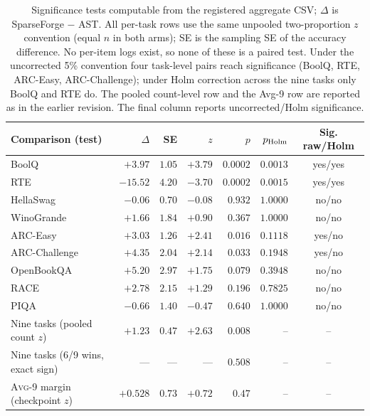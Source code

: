 \documentclass{article}
\newcommand{\taskavg}{\textsc{Avg}-9}
\begin{document}
\begin{table}[h]\centering\small\setlength{\tabcolsep}{3.2pt}
\caption{Significance tests computable from the registered aggregate CSV;
$\Delta$ is SparseForge $-$ AST. All per-task rows use the same unpooled
two-proportion $z$ convention (equal $n$ in both arms); SE is the sampling
SE of the accuracy difference. No per-item logs exist, so none of these is a
paired test. Under the uncorrected 5\% convention four task-level pairs
reach significance (BoolQ, RTE, ARC-Easy, ARC-Challenge); under Holm
correction across the nine tasks only BoolQ and RTE do. The pooled
count-level row and the Avg-9 row are reported as in the earlier revision.
The final column reports uncorrected/Holm significance.}
\label{tab:pertask-tests}
\begin{tabular}{@{}lrrrrrc@{}}
\toprule
Comparison (test) & $\Delta$ & SE & $z$ & $p$ & $p_{\rm Holm}$ & Sig. raw/Holm \\
\midrule
BoolQ & $+3.97$ & $1.05$ & ${+}3.79$ & $0.0002$ & $0.0013$ & yes/yes \\
RTE & $-15.52$ & $4.20$ & ${-}3.70$ & $0.0002$ & $0.0015$ & yes/yes \\
HellaSwag & $-0.06$ & $0.70$ & ${-}0.08$ & $0.932$ & $1.0000$ & no/no \\
WinoGrande & $+1.66$ & $1.84$ & ${+}0.90$ & $0.367$ & $1.0000$ & no/no \\
ARC-Easy & $+3.03$ & $1.26$ & ${+}2.41$ & $0.016$ & $0.1118$ & yes/no \\
ARC-Challenge & $+4.35$ & $2.04$ & ${+}2.14$ & $0.033$ & $0.1948$ & yes/no \\
OpenBookQA & $+5.20$ & $2.97$ & ${+}1.75$ & $0.079$ & $0.3948$ & no/no \\
RACE & $+2.78$ & $2.15$ & ${+}1.29$ & $0.196$ & $0.7825$ & no/no \\
PIQA & $-0.66$ & $1.40$ & ${-}0.47$ & $0.640$ & $1.0000$ & no/no \\
\midrule
Nine tasks (pooled count $z$) & $+1.23$ & $0.47$ & ${+}2.63$ & $0.008$ & -- & -- \\
Nine tasks (6/9 wins, exact sign) & --- & --- & --- & $0.508$ & -- & -- \\
\taskavg{} margin (checkpoint $z$) & $+0.528$ & $0.73$ & ${+}0.72$ & $0.47$ & -- & -- \\
\bottomrule
\end{tabular}
\end{table}
\end{document}
